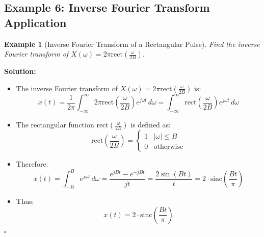 \documentclass[12pt]{article}
\newtheorem{example}{Example}
\newenvironment{solution}{\noindent\textbf{Solution:}}{\hfill$\square$}
\begin{document}
\subsection{Example 6: Inverse Fourier Transform Application}
\begin{example}[Inverse Fourier Transform of a Rectangular Pulse]
Find the inverse Fourier transform of \( X(\omega) = 2\pi \text{rect}\left(\frac{\omega}{2B}\right) \).
\end{example}
\begin{solution}
\begin{itemize}
    \item The inverse Fourier transform of \( X(\omega) = 2\pi \text{rect}\left(\frac{\omega}{2B}\right) \) is:
    \[
    x(t) = \frac{1}{2\pi} \int_{-\infty}^{\infty} 2\pi \text{rect}\left(\frac{\omega}{2B}\right) e^{j\omega t} \, d\omega = \int_{-\infty}^{\infty} \text{rect}\left(\frac{\omega}{2B}\right) e^{j\omega t} \, d\omega
    \]
    \item The rectangular function \( \text{rect}\left(\frac{\omega}{2B}\right) \) is defined as:
    \[
    \text{rect}\left(\frac{\omega}{2B}\right) = 
    \begin{cases}
    1 & |\omega| \leq B \\
    0 & \text{otherwise}
    \end{cases}
    \]
    \item Therefore:
    \[
    x(t) = \int_{-B}^{B} e^{j\omega t} \, d\omega = \frac{e^{jBt} - e^{-jBt}}{jt} = \frac{2\sin(Bt)}{t} = 2 \cdot \text{sinc}\left(\frac{Bt}{\pi}\right)
    \]
    \item Thus:
    \[
    x(t) = 2 \cdot \text{sinc}\left(\frac{Bt}{\pi}\right)
    \]
\end{itemize}
\end{solution}
\end{document}
